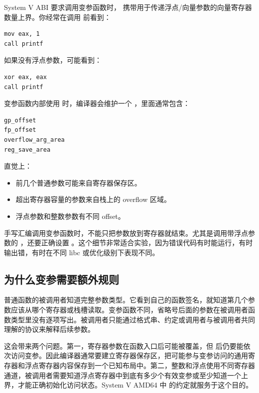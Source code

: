 System V ABI 要求调用变参函数时， 携带用于传递浮点/向量参数的向量寄存器数量上界。你经常在调用  前看到：

\begin{lstlisting}
mov eax, 1
call printf
\end{lstlisting}

如果没有浮点参数，可能看到：

\begin{lstlisting}
xor eax, eax
call printf
\end{lstlisting}

变参函数内部使用  时，编译器会维护一个 ，里面通常包含：

\begin{lstlisting}
gp_offset
fp_offset
overflow_arg_area
reg_save_area
\end{lstlisting}

直觉上：

\begin{itemize}
  \item 前几个普通参数可能来自寄存器保存区。
  \item 超出寄存器容量的参数来自栈上的 overflow 区域。
  \item 浮点参数和整数参数有不同 offset。
\end{itemize}

\begin{deepdive}
手写汇编调用变参函数时，不能只把参数放到寄存器就结束。尤其是调用带浮点参数的 ，还要正确设置 。这个细节非常适合实验，因为错误代码有时能运行，有时输出错，有时在不同 libc 或优化级别下表现不同。
\end{deepdive}

\subsection{为什么变参需要额外规则}

普通函数的被调用者知道完整参数类型。它看到自己的函数签名，就知道第几个参数应该从哪个寄存器或栈槽读取。变参函数不同，省略号后面的参数在被调用者函数类型里没有逐项写出。被调用者只能通过格式串、约定或调用者与被调用者共同理解的协议来解释后续参数。

这会带来两个问题。第一，寄存器参数在函数入口后可能被覆盖，但  后仍要能依次访问变参。因此编译器通常要建立寄存器保存区，把可能参与变参访问的通用寄存器和浮点寄存器内容保存到一个已知布局中。第二，整数和浮点使用不同寄存器通道，被调用者需要知道浮点寄存器中到底有多少个有效变参或至少知道一个上界，才能正确初始化访问状态。System V AMD64 中  的约定就服务于这个目的。

